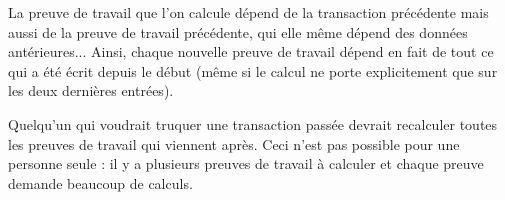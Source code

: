 \documentclass[11pt,class=report,crop=false]{standalone}
\begin{document}
\begin{cours}
La preuve de travail que l'on calcule dépend de la transaction précédente mais aussi de la preuve de travail précédente, qui elle même dépend des données antérieures... Ainsi, chaque nouvelle preuve de travail dépend en fait de tout ce qui a été écrit depuis le début (même si le calcul ne porte explicitement que sur les deux dernières entrées).

Quelqu'un qui voudrait truquer une transaction passée devrait recalculer toutes les preuves de travail qui viennent après. Ceci n'est pas possible pour une personne seule : il y a plusieurs preuves de travail à calculer et chaque preuve demande beaucoup de calculs.
\end{cours}


\end{document}
